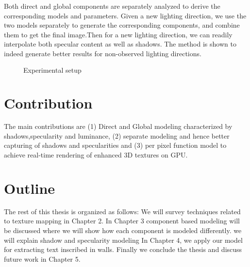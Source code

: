 Both direct and global components are separately analyzed to derive the
corresponding models and parameters. Given a new lighting direction, we use the
two models separately to generate the corresponding components, and combine them
to get the final image.Then for a new lighting direction, we can readily
interpolate both specular content as well as shadows.
The method is shown to indeed
generate better results for non-observed lighting directions.
\begin{figure}[t]
\centering
{}
\caption{Experimental setup}
\end{figure}
\section{Contribution}
The main contributions are (1) Direct and Global modeling characterized by
shadows,specularity and luminance, 
(2) separate modeling and hence better capturing of shadows and specularities 
and (3) per pixel function model to
achieve real-time rendering of enhanced 3D textures on GPU.

\section{Outline}
The rest of this thesis is organized as follows: We will survey techniques 
related to texture mapping in Chapter 2. In Chapter 3
component based modeling will be discussed where we will show how each component is
modeled differently. 
we will explain
shadow and specularity modeling
In Chapter 4, we apply our model for extracting text 
inscribed in walls. Finally we 
conclude the thesis and discuss future work in Chapter 5.

